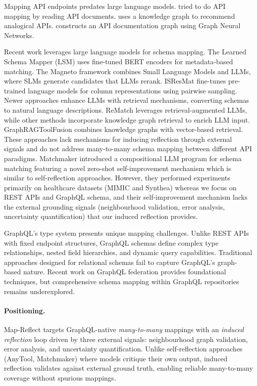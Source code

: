 \documentclass[sigconf, nonacm]{acmart}
\begin{document}
Mapping API endpoints predates large language models. \cite{lu2017learning} tried to do API mapping by reading API documents. \cite{liu2023recommeding} uses a knowledge graph to recommend analogical APIs. \cite{shao2022cross} constructs an API documentation graph using Graph Neural Networks. 

Recent work leverages large language models for schema mapping. The Learned Schema Mapper (LSM) \cite{zhang2023schema} uses fine-tuned BERT encoders for metadata-based matching. The Magneto framework \cite{liu2024magneto} combines Small Language Models and LLMs, where SLMs generate candidates that LLMs rerank. ISResMat \cite{du2024in} fine-tunes pre-trained language models for column representations using pairwise sampling. Newer approaches enhance LLMs with retrieval mechanisms, converting schemas to natural language descriptions. ReMatch \cite{sheetrit2024rematch} leverages retrieval-augmented LLMs, while other methods \cite{ma2025knowledge} incorporate knowledge graph retrieval to enrich LLM input. GraphRAGToolFusion \cite{lumer2025graphragtoolfusion} combines knowledge graphs with vector-based retrieval. These approaches lack mechanisms for inducing reflection through external signals and do not address many-to-many schema mapping between different API paradigms. Matchmaker \cite{matchmaker} introduced a compositional LLM program for schema matching featuring a novel zero-shot self-improvement mechanism which is similar to self-reflection approaches. However, they performed experiments primarily on healthcare datasets (MIMIC and Synthea) whereas we focus on REST APIs and GraphQL schema, and their self-improvement mechanism lacks the external grounding signals (neighbourhood validation, error analysis, uncertainty quantification) that our induced reflection provides.

GraphQL's type system presents unique mapping challenges. Unlike REST APIs with fixed endpoint structures, GraphQL schemas define complex type relationships, nested field hierarchies, and dynamic query capabilities. Traditional approaches designed for relational schemas fail to capture GraphQL's graph-based nature. Recent work on GraphQL federation provides foundational techniques, but comprehensive schema mapping within GraphQL repositories remains underexplored.

\paragraph{Positioning.} Map-Reflect targets GraphQL-native \emph{many-to-many} mappings with an \emph{induced reflection} loop driven by three external signals: neighbourhood graph validation, error analysis, and uncertainty quantification. Unlike self-reflection approaches (AnyTool, Matchmaker) where models critique their own output, induced reflection validates against external ground truth, enabling reliable many-to-many coverage without spurious mappings.
\end{document}
